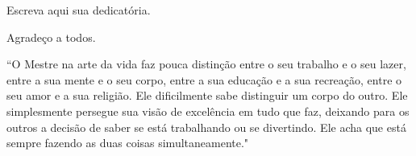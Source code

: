 \begin{dedicatoria}%
Escreva aqui sua dedicatória.
\end{dedicatoria}

\begin{agradecimento}
Agradeço a todos.
\end{agradecimento}%


\begin{epigrafo}
``O Mestre na arte da vida faz pouca distinção entre o seu trabalho e o seu lazer, entre a sua mente e o seu corpo, entre a sua educação e a sua recreação, entre o seu amor e a sua religião. Ele dificilmente sabe distinguir um corpo do outro. Ele simplesmente persegue sua visão de excelência em tudo que faz, deixando para os outros a decisão de saber se está trabalhando ou se divertindo. Ele acha que está sempre fazendo as duas coisas simultaneamente."
\end{epigrafo}